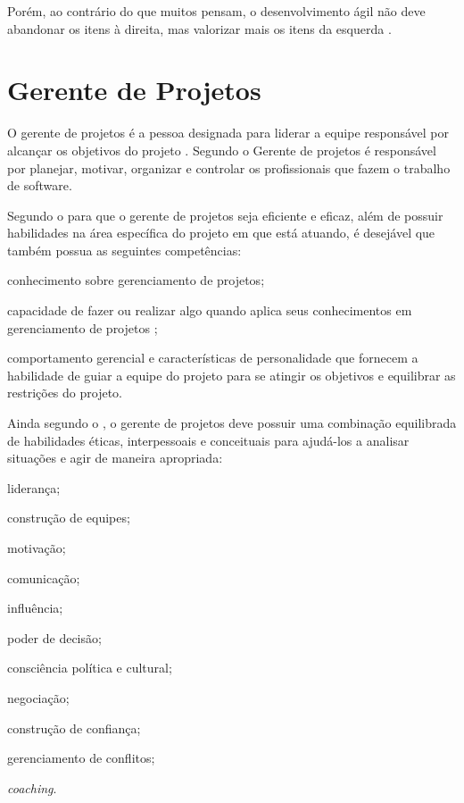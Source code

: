 \documentclass[
    12pt,               %
    openright,          %
    twoside,            %
    a4paper,            %
    chapter=TITLE,     %
    english,            %
    spanish,            %
    portuguese              %
    ]{abntex2}
\begin{document}
Porém, ao contrário do que muitos pensam, o desenvolvimento ágil não deve abandonar os itens à direita, mas valorizar mais os itens da esquerda \cite{manifesto2001}.

\section{Gerente de Projetos}
O gerente de projetos é a pessoa designada para liderar a equipe responsável por alcançar os objetivos do projeto \cite[p.~16]{pmi2013}. Segundo  o Gerente de projetos é responsável por planejar, motivar, organizar e controlar os profissionais que fazem o trabalho de software.

Segundo o  para que o gerente de projetos seja eficiente e eficaz, além de possuir habilidades na área específica do projeto em que está atuando, é desejável que também possua as seguintes competências:

\begin{alineas}
	\item conhecimento sobre gerenciamento de projetos;
	\item capacidade de fazer ou realizar algo quando aplica seus conhecimentos em gerenciamento de projetos ;
	\item comportamento gerencial e características de personalidade que fornecem a habilidade de guiar a equipe do projeto para se atingir os objetivos e equilibrar as restrições do projeto.
\end{alineas}

Ainda segundo o , o gerente de projetos deve possuir uma combinação equilibrada de habilidades éticas, interpessoais e conceituais para ajudá-los a analisar situações e agir de maneira apropriada:

\begin{alineas}
	\item liderança;
	\item construção de equipes;
	\item motivação;
	\item comunicação;
	\item influência;
	\item poder de decisão;
	\item consciência política e cultural;
	\item negociação;
	\item construção de confiança;
	\item gerenciamento de conflitos;
	\item \textit{coaching}.
\end{alineas}
\end{document}
